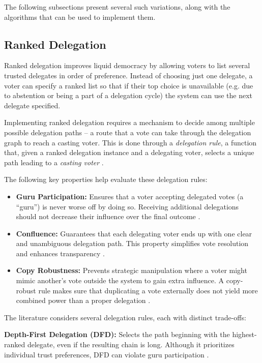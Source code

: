 The following subsections present several such variations, along with the algorithms that can be used to implement them.
\subsection*{Ranked Delegation}
Ranked delegation improves liquid democracy by allowing voters to list several trusted delegates in order of preference. Instead of choosing just one delegate, a voter can specify a ranked list so that if their top choice is unavailable (e.g. due to abstention or being a part of a delegation cycle) the system can use the next delegate specified.

Implementing ranked delegation requires a mechanism to decide among multiple possible delegation paths -- a route that a vote can take through the delegation graph to reach a casting voter.
This is done through a \textit{delegation rule}, a function that, given a ranked delegation instance and a delegating voter, selects a unique path leading to a \textit{casting voter} \citep{brill_liquid_2022}.

The following key properties help evaluate these delegation rules:

\begin{itemize}
    \item \textbf{Guru Participation:} Ensures that a voter accepting delegated votes (a ``guru'') is never worse off by doing so. Receiving additional delegations should not decrease their influence over the final outcome \citep{kotsialou_riley_2020}. 
    \item \textbf{Confluence:} Guarantees that each delegating voter ends up with one clear and unambiguous delegation path. This property simplifies vote resolution and enhances transparency \citep{brill_liquid_2022}. 
    \item \textbf{Copy Robustness:} Prevents strategic manipulation where a voter might mimic another's vote outside the system to gain extra influence. A copy-robust rule makes sure that duplicating a vote externally does not yield more combined power than a proper delegation \citep{brill_liquid_2022,behrens_2015}. 
\end{itemize}

The literature considers several delegation rules, each with distinct trade-offs:

\textbf{Depth-First Delegation (DFD):} Selects the path beginning with the highest-ranked delegate, even if the resulting chain is long. Although it prioritizes individual trust preferences, DFD can violate guru participation \citep{kotsialou_riley_2020}.


